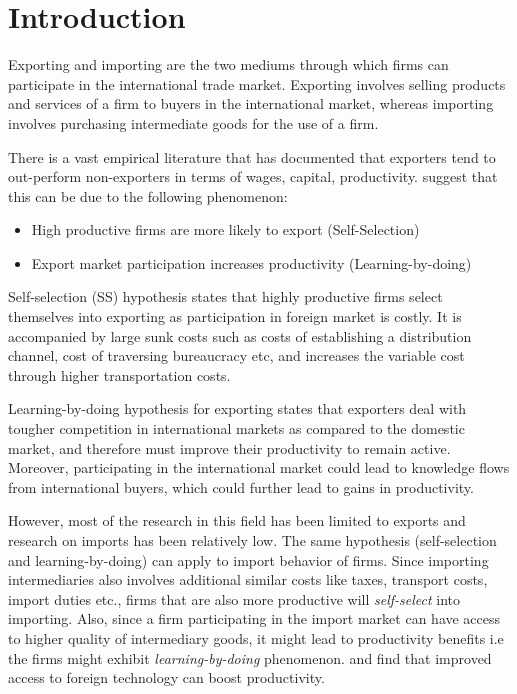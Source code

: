 \documentclass[12pt]{article}
\begin{document}
%

\newpage
\small

\tableofcontents

\newpage
{}
\section{Introduction}\label{sec:introduction}

Exporting and importing are the two mediums through which firms can
participate in the international trade market. Exporting involves
selling products and services of a firm to buyers in the international
market, whereas importing involves purchasing intermediate goods for
the use of a firm.  

There is a vast empirical literature  that has documented that exporters tend to
out-perform non-exporters  in terms of wages, capital,
productivity.%
  \textcite{bernard1999exceptional}  suggest that this can be due
to the following phenomenon:
\begin{itemize}
\item High productive firms are more likely to export (Self-Selection)
\item Export market participation increases productivity (Learning-by-doing)
\end{itemize}

Self-selection (SS) hypothesis states that highly productive firms
select themselves into exporting as  
participation in foreign market is costly. It is accompanied by large
sunk costs
such as costs of establishing a distribution channel,
cost of traversing bureaucracy etc, and increases the variable cost
through higher transportation costs. %

Learning-by-doing hypothesis for exporting  states that exporters deal with
tougher competition in international markets as compared to the
domestic market, and therefore must improve their productivity to
remain active. Moreover, participating in the
international market could lead to knowledge flows from international
buyers, which could further lead to gains in productivity.

However, most of the research in this field has been limited to
exports and research on imports has been relatively low. The same hypothesis (self-selection and learning-by-doing) can  apply
to import behavior of firms. Since importing intermediaries also
involves additional
similar costs like  taxes, transport costs, import duties
etc., firms that are also more productive will \textit{self-select}
into importing. Also, since a firm
participating in the import market can have access to higher quality
of intermediary goods, it might lead to productivity benefits
i.e the firms might exhibit \textit{learning-by-doing} phenomenon. 
\textcite{topalova2011trade}  and \textcite{halpern2011imported}
find that improved access to foreign technology can boost
productivity. 
\end{document}
